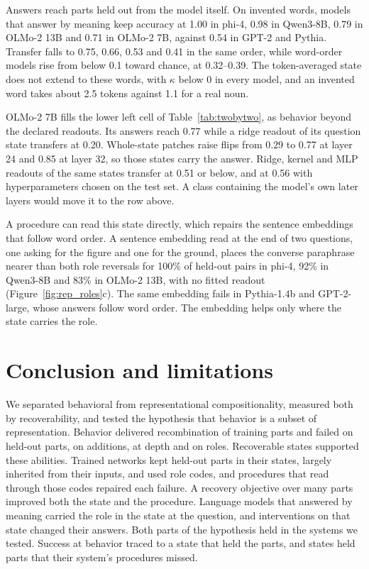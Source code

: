 \documentclass[10pt]{article}
\theoremstyle{plain}
\theoremstyle{remark}
\begin{document}
Answers reach parts held out from the model itself. On invented words, models that answer by meaning keep accuracy at 1.00 in phi-4, 0.98 in Qwen3-8B, 0.79 in OLMo-2 13B and 0.71 in OLMo-2 7B, against 0.54 in GPT-2 and Pythia. Transfer falls to 0.75, 0.66, 0.53 and 0.41 in the same order, while word-order models rise from below 0.1 toward chance, at 0.32--0.39. The token-averaged state does not extend to these words, with $\kappa$ below 0 in every model, and an invented word takes about 2.5 tokens against 1.1 for a real noun.

OLMo-2 7B fills the lower left cell of Table~\ref{tab:twobytwo}, as behavior beyond the declared readouts. Its answers reach 0.77 while a ridge readout of its question state transfers at 0.20. Whole-state patches raise flips from 0.29 to 0.77 at layer 24 and 0.85 at layer 32, so those states carry the answer. Ridge, kernel and MLP readouts of the same states transfer at 0.51 or below, and at 0.56 with hyperparameters chosen on the test set. A class containing the model's own later layers would move it to the row above.

A procedure can read this state directly, which repairs the sentence embeddings that follow word order. A sentence embedding read at the end of two questions, one asking for the figure and one for the ground, places the converse paraphrase nearer than both role reversals for 100\% of held-out pairs in phi-4, 92\% in Qwen3-8B and 83\% in OLMo-2 13B, with no fitted readout (Figure~\ref{fig:rep_roles}c). The same embedding fails in Pythia-1.4b and GPT-2-large, whose answers follow word order. The embedding helps only where the state carries the role.

\section{Conclusion and limitations}
\label{sec:discussion}

We separated behavioral from representational compositionality, measured both by recoverability, and tested the hypothesis that behavior is a subset of representation. Behavior delivered recombination of training parts and failed on held-out parts, on additions, at depth and on roles. Recoverable states supported these abilities. Trained networks kept held-out parts in their states, largely inherited from their inputs, and used role codes, and procedures that read through those codes repaired each failure. A recovery objective over many parts improved both the state and the procedure. Language models that answered by meaning carried the role in the state at the question, and interventions on that state changed their answers. Both parts of the hypothesis held in the systems we tested. Success at behavior traced to a state that held the parts, and states held parts that their system's procedures missed.
\end{document}

